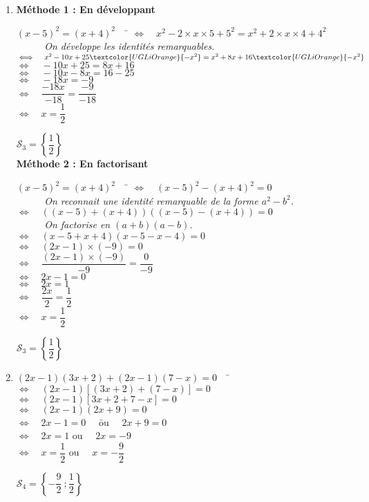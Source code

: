\documentclass[a4paper,11pt,exos]{nsi} %
\begin{document}
\begin{enumerate}
    \item \textbf{Méthode 1 : En développant}
    \begin{tabbing}
        $(x-5)^2=(x+4)^2\quad$  \=  $\iff\quad x^2-2\times x\times 5+5^2=x^2+2\times x\times 4+4^2$\\
        \>  $\phantom{\iff}\quad$ \textit{On développe les identités remarquables.}\\
        \>  $\iff\quad x^2-10x+25\textcolor{UGLiOrange}{-x^2}=x^2+8x+16\textcolor{UGLiOrange}{-x^2}$\\
        \>  $\iff\quad -10x+25=8x+16$\\
        \>  $\iff\quad -10x-8x=16-25$\\
        \>  $\iff\quad -18x=-9$\\
        \>  $\iff\quad \dfrac{-18x}{-18}=\dfrac{-9}{-18}$\\
        \>  $\iff\quad  x=\dfrac{1}{2}$
    \end{tabbing}
    $\mathcal{S}_3=\left\{\dfrac{1}{2}\right\}$\\
\newpage
    \textbf{Méthode 2 : En factorisant}
    \begin{tabbing}
        $(x-5)^2=(x+4)^2\quad$  \=  $\iff\quad (x-5)^2-(x+4)^2=0$\\
        \>  $\phantom{\iff}\quad$ \textit{On reconnait une identité remarquable de la forme $a^2-b^2$.}\\
        \>  $\iff\quad \left((x-5)+(x+4)\right)\left((x-5)-(x+4)\right)=0$\\
        \>  $\phantom{\iff}\quad$ \textit{On factorise en $(a+b)(a-b)$.}\\
        \>  $\iff\quad (x-5+x+4)(x-5-x-4)=0$\\
        \>  $\iff\quad (2x-1)\times(-9)=0$\\
        \>  $\iff\quad \dfrac{(2x-1)\times(-9)}{-9}=\dfrac{0}{-9}$\\
        \>  $\iff\quad 2x-1=0$\\
        \>  $\iff\quad 2x=1$\\
        \>  $\iff\quad \dfrac{2x}{2}=\dfrac{1}{2}$\\
        \>  $\iff\quad  x=\dfrac{1}{2}$
    \end{tabbing}
    $\mathcal{S}_3=\left\{\dfrac{1}{2}\right\}$

    \item \begin{tabbing}
        $(2x-1)(3x+2)+(2x-1)(7-x)=0 \quad$ \= $\iff\quad (2x-1)\left[(3x+2)+(7-x)\right]=0$\\
        \>  $\iff\quad (2x-1)\left[3x+2+7-x\right]=0$\\
        \>  $\iff\quad (2x-1)(2x+9)=0$\\
        \>  $\iff\quad 2x-1=0\quad$ \= ou $\quad 2x+9=0$\\
        \>  $\iff\quad 2x=1$    \> ou $\quad 2x=-9$\\
        \>  $\iff\quad x=\dfrac{1}{2}$  \> ou $\quad x=-\dfrac{9}{2}$
    \end{tabbing}
    $\mathcal{S}_4=\left\{-\dfrac{9}{2}\ ; \dfrac{1}{2}\right\}$


\end{enumerate}
\end{document}
